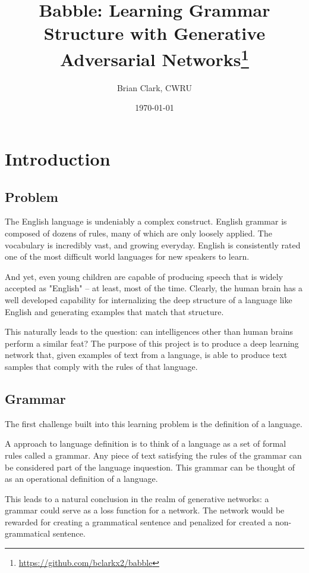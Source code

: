 \documentclass[12pt]{article}
\title{Babble: Learning Grammar Structure with Generative Adversarial Networks\thanks{\url{https://github.com/bclarkx2/babble}}}
\author{Brian Clark, CWRU}
\date{\today}
\begin{document}
\maketitle
\tableofcontents


\section{Introduction}

\subsection{Problem}

The English language is undeniably a complex construct. English grammar is composed of dozens of rules, many of which are only loosely applied. The vocabulary is incredibly vast, and growing everyday. English is consistently rated one of the most difficult world languages for new speakers to learn.

And yet, even young children are capable of producing speech that is widely accepted as "English" -- at least, most of the time. Clearly, the human brain has a well developed capability for internalizing the deep structure of a language like English and generating examples that match that structure.

This naturally leads to the question: can intelligences other than human brains perform a similar feat? The purpose of this project is to produce a deep learning network that, given examples of text from a language, is able to produce text samples that comply with the rules of that language.

\subsection{Grammar}

The first challenge built into this learning problem is the definition of a language.

A approach to language definition is to think of a language as a set of formal rules called a grammar\cite{nltk_book}. Any piece of text satisfying the rules of the grammar can be considered part of the language inquestion. This grammar can be thought of as an operational definition of a language.

This leads to a natural conclusion in the realm of generative networks: a grammar could serve as a loss function for a network. The network would be rewarded for creating a grammatical sentence and penalized for created a non-grammatical sentence.
\end{document}
